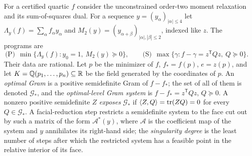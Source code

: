 For a certified quartic $f$ consider the unconstrained order-two moment
relaxation and its sum-of-squares dual. For a sequence
$y=(y_\alpha)_{|\alpha|\le4}$ let $\Lambda_y(f)=\sum_\alpha f_\alpha y_\alpha$
and $M_2(y)=(y_{\alpha+\beta})_{|\alpha|,|\beta|\le2}$, indexed like $z$. The
programs are
\begin{equation}
 \text{(P)}\ \ \min\{\Lambda_y(f):y_0=1,\ M_2(y)\succeq0\},
 \qquad
 \text{(S)}\ \ \max\{\gamma:f-\gamma=z^{\mathsf T}Qz,\ Q\succeq0\}.
 \label{eq:heights-moment-programs}
\end{equation}
Their data are rational. Let $p$ be the minimizer of $f$, $f_*=f(p)$,
$e=z(p)$, and let $K=\mathbb Q(p_1,\ldots,p_n)\subseteq\mathbb R$ be the field generated by
the coordinates of $p$. An \emph{optimal Gram} is a positive semidefinite
Gram of $f-f_*$; the set of all of them is denoted $\mathcal G_*$, and the
\emph{optimal-level Gram system} is $f-f_*=z^{\mathsf T}Qz$, $Q\succeq0$. A
nonzero positive semidefinite $Z$ \emph{exposes} $\mathcal G_*$ if
$\left\langle Z,Q\right\rangle=\operatorname{tr}(ZQ)=0$ for every $Q\in\mathcal G_*$. A facial-reduction step
\cite{BorweinWolkowicz1981} restricts a semidefinite system to the face cut
out by such a matrix of the form $\mathcal A^*(y)$, where $\mathcal A$ is the
coefficient map of the system and $y$ annihilates its right-hand side; the
\emph{singularity degree} is the least number of steps after which the
restricted system has a feasible point in the relative interior of its
face.

